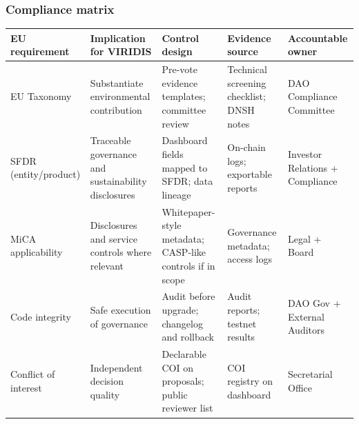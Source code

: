 \documentclass[
  english,
  12pt,
  oneside,
  open=any]{scrbook}
\begin{document}
\subsubsection{Compliance matrix}\label{compliance-matrix}

\begin{longtable}[]{@{}
  >{\raggedright\arraybackslash}p{}
  >{\raggedright\arraybackslash}p{}
  >{\raggedright\arraybackslash}p{}
  >{\raggedright\arraybackslash}p{}
  >{\raggedright\arraybackslash}p{}@{}}
\toprule\noalign{}
\begin{minipage}[b]{\linewidth}\raggedright
EU requirement
\end{minipage} & \begin{minipage}[b]{\linewidth}\raggedright
Implication for VIRIDIS
\end{minipage} & \begin{minipage}[b]{\linewidth}\raggedright
Control design
\end{minipage} & \begin{minipage}[b]{\linewidth}\raggedright
Evidence source
\end{minipage} & \begin{minipage}[b]{\linewidth}\raggedright
Accountable owner
\end{minipage} \\
\midrule\noalign{}
\endhead
\bottomrule\noalign{}
\endlastfoot
EU Taxonomy & Substantiate environmental contribution & Pre-vote
evidence templates; committee review & Technical screening checklist;
DNSH notes & DAO Compliance Committee \\
SFDR (entity/product) & Traceable governance and sustainability
disclosures & Dashboard fields mapped to SFDR; data lineage & On-chain
logs; exportable reports & Investor Relations + Compliance \\
MiCA applicability & Disclosures and service controls where relevant &
Whitepaper-style metadata; CASP-like controls if in scope & Governance
metadata; access logs & Legal + Board \\
Code integrity & Safe execution of governance & Audit before upgrade;
changelog and rollback & Audit reports; testnet results & DAO Gov +
External Auditors \\
Conflict of interest & Independent decision quality & Declarable COI on
proposals; public reviewer list & COI registry on dashboard &
Secretarial Office \\
\end{longtable}
\end{document}
